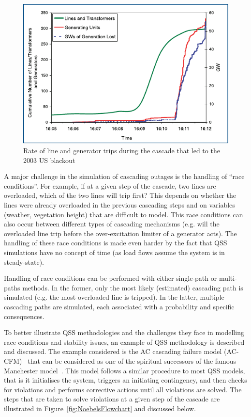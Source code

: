 \begin{figure}
    \centering
    \includegraphics[width=0.6\linewidth]{Figs/USBlackout2003.pdf}
    \caption{Rate of line and generator trips during the cascade that led to the 2003 US blackout~\cite{StabilityDefinitionRevised}}
    \label{fig:BlackoutUS2003}
\end{figure}

A major challenge in the simulation of cascading outages is the handling of ``race conditions''. For example, if at a given step of the cascade, two lines are overloaded, which of the two lines will trip first? This depends on whether the lines were already overloaded in the previous cascading steps and on variables (weather, vegetation height) that are difficult to model. This race conditions can also occur between different types of cascading mechanisms (e.g. will the overloaded line trip before the over-excitation limiter of a generator acts). The handling of these race conditions is made even harder by the fact that QSS simulations have no concept of time (as load flows assume the system is in steady-state).

Handling of race conditions can be performed with either single-path or multi-paths methods. In the former, only the most likely (estimated) cascading path is simulated (e.g. the most overloaded line is tripped). In the latter, multiple cascading paths are simulated, each associated with a probability and specific consequences.

To better illustrate QSS methodologies and the challenges they face in modelling race conditions and stability issues, an example of QSS methodology is described and discussed. The example considered is the AC cascading failure model (AC-CFM)~\cite{ManchesterNoebels} that can be considered as one of the spiritual successors of the famous Manchester model~\cite{OriginalManchesterModel}. This model follows a similar procedure to most QSS models, that is it initialises the system, triggers an initiating contingency, and then checks for violations and performs corrective actions until all violations are solved. The steps that are taken to solve violations at a given step of the cascade are illustrated in Figure~\ref{fig:NoebelsFlowchart} and discussed below.

